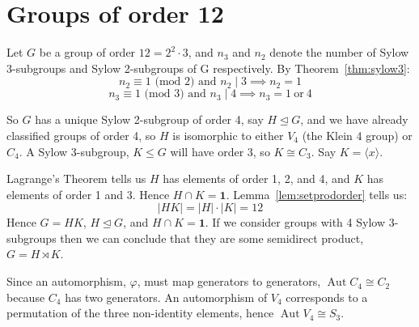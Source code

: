 \documentclass[a4paper, oneside, 12pt, final]{article}
\theoremstyle{definition}
\DeclareMathOperator{\Aut}{Aut}
\newcommand{\nrmsgp}{\unlhd}
\begin{document}
\section{Groups of order 12}
Let \(G\) be a group of order \(12 = 2^2 \cdot 3\), and \(n_3\) and \(n_2\) denote the number of Sylow 3-subgroups and
Sylow 2-subgroups of G respectively.
By Theorem~\ref{thm:sylow3}:
\[n_2 \equiv 1 \text{ (mod 2) and } n_2 \mid 3 \implies n_2 = 1\]
\[n_3 \equiv 1 \text{ (mod 3) and } n_3 \mid 4 \implies n_3 = 1 \ \text{or} \ 4\]

So \(G\) has a unique Sylow 2-subgroup of order 4, say \(H \nrmsgp G\), and we have already classified groups of order 4,
so \(H\) is isomorphic to either \(V_4\) (the Klein 4 group) or \(C_4\).
A Sylow 3-subgroup, \(K \leqslant G\) will have order 3, so \(K \cong C_3\).
Say \(K = \langle x \rangle\).

Lagrange's Theorem tells us \(H\) has elements of order 1, 2, and 4, and \(K\) has elements of order 1 and 3.
Hence \(H \cap K = \bm{1}\).
Lemma~\ref{lem:setprodorder} tells us:
\[|HK| = |H| \cdot |K| = 12\]
Hence \(G = HK\), \(H \nrmsgp G\), and \(H \cap K = \bm{1}\).
If we consider groups with 4 Sylow 3-subgroups then we can conclude that they are some semidirect product, \(G = H
\rtimes K\).

Since an automorphism, \(\varphi\), must map generators to generators, \(\Aut{C_4} \cong C_2\) because \(C_4\) has two
generators.
An automorphism of \(V_4\) corresponds to a permutation of the three
non-identity elements, hence \(\Aut{V_4} \cong S_3\).
\end{document}
